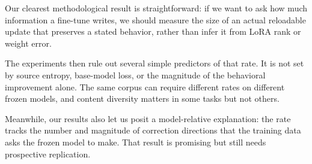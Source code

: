 Our clearest methodological result is straightforward: if we want to ask how much information a fine-tune writes, we should measure the size of an actual reloadable update that preserves a stated behavior, rather than infer it from LoRA rank or weight error.

The experiments then rule out several simple predictors of that rate. It is not set by source entropy, base-model loss, or the magnitude of the behavioral improvement alone. The same corpus can require different rates on different frozen models, and content diversity matters in some tasks but not others.

Meanwhile, our results also let us posit a model-relative explanation: the rate tracks the number and magnitude of correction directions that the training data asks the frozen model to make. That result is promising but still needs prospective replication.
